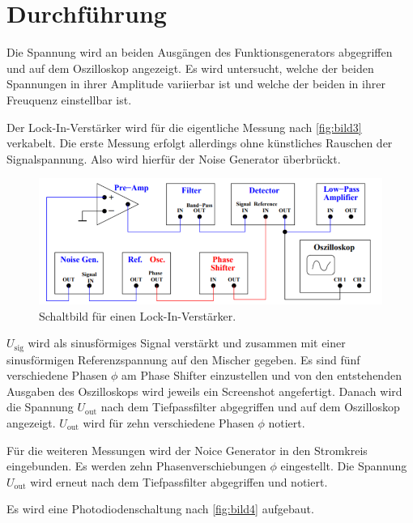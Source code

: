 \section{Durchführung}
\label{sec:Durchführung}


Die Spannung wird an beiden Ausgängen des Funktionsgenerators abgegriffen und auf dem Oszilloskop angezeigt.
Es wird untersucht, welche der beiden Spannungen in ihrer Amplitude variierbar ist und welche der beiden in ihrer Freuquenz einstellbar ist.

Der Lock-In-Verstärker wird für die eigentliche Messung nach \autoref{fig:bild3} verkabelt.
Die erste Messung erfolgt allerdings ohne künstliches Rauschen der Signalspannung.
Also wird hierfür der Noise Generator überbrückt.

\begin{figure}
    \centering
    \includegraphics[width=\textwidth/2]{images/bild3.png}
    \caption{Schaltbild für einen Lock-In-Verstärker.\cite{V303}}
    \label{fig:bild3}
\end{figure}

$U_\text{sig}$ wird als sinusförmiges Signal verstärkt und zusammen mit einer sinusförmigen Referenzspannung auf den Mischer gegeben.
Es sind fünf verschiedene Phasen $\phi$ am Phase Shifter einzustellen und von den entstehenden Ausgaben des Oszilloskops wird jeweils ein Screenshot angefertigt.
Danach wird die Spannung $U_\text{out}$ nach dem Tiefpassfilter abgegriffen und auf dem Oszilloskop angezeigt.
$U_\text{out}$ wird für zehn verschiedene Phasen $\phi$ notiert.

Für die weiteren Messungen wird der Noice Generator in den Stromkreis eingebunden. 
Es werden zehn Phasenverschiebungen $\phi$ eingestellt.
Die Spannung $U_\text{out}$ wird erneut nach dem Tiefpassfilter abgegriffen und notiert.


Es wird eine Photodiodenschaltung nach \autoref{fig:bild4} aufgebaut.

